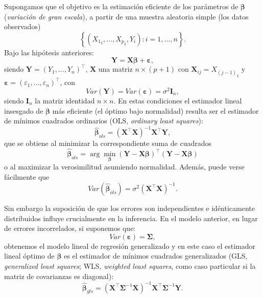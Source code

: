 \documentclass[
]{book}
\theoremstyle{break}
\theoremstyle{definition}
\theoremstyle{definition}
\theoremstyle{definition}
\theoremstyle{definition}
\theoremstyle{remark}
\begin{document}
Supongamos que el objetivo es la estimación eficiente de los parámetros de \(\boldsymbol{\beta}\) (\emph{variación de gran escala}), a partir de una muestra aleatoria simple (los datos observados)
\[\left\{ \left( {X_1}_i, \ldots, {X_p}_i, Y_{i} \right)  : i = 1, \ldots, n \right\}.\]
Bajo las hipótesis anteriores:
\[\mathbf{Y} = \mathbf{X}\boldsymbol{\beta} + \boldsymbol{\varepsilon},\]
siendo \(\mathbf{Y}=\left( Y_1, \ldots, Y_n \right)^{\top}\), \(\mathbf{X}\) una matriz \(n\times (p+1)\) con \(\mathbf{X}_{ij} = {X_{(j-1)}}_i\) y \(\boldsymbol{\varepsilon} = \left( \varepsilon_1, \ldots,\varepsilon_n \right)^{\top}\), con
\[Var\left( \mathbf{Y} \right) =Var\left( \boldsymbol{\varepsilon} \right) = \sigma^{2} \mathbf{I}_{n},\]
siendo \(\mathbf{I}_{n}\) la matriz identidad \(n\times n\).
En estas condiciones el estimador lineal insesgado de \(\boldsymbol{\beta}\) más eficiente (el óptimo bajo normalidad) resulta ser el estimador de mínimos cuadrados ordinarios (OLS, \emph{ordinary least squares}):
\begin{equation} 
  \hat{\boldsymbol{\beta}}_{ols}=(\mathbf{X}^{\top}\mathbf{X})^{-1}\mathbf{X}^{\top}\mathbf{Y},
  \label{eq:beta-ols-rlm}
\end{equation}
que se obtiene al minimizar la correspondiente suma de cuadrados
\[\hat{\boldsymbol{\beta}}_{ols} = \arg \min_{\mathbf{\beta }}\left( \mathbf{Y}-\mathbf{X}\mathbf{\beta }\right)^{\top }\left( \mathbf{Y}-\mathbf{X}\mathbf{\beta }\right)\]
o al maximizar la verosimilitud asumiendo normalidad.
Además, puede verse fácilmente que
\[Var(\hat{\boldsymbol{\beta}}_{ols})=\sigma^{2}(\mathbf{X}^{\top}\mathbf{X})^{-1}.\]

Sin embargo la suposición de que los errores son independientes e idénticamente distribuidos influye crucialmente en la inferencia.
En el modelo anterior, en lugar de errores incorrelados, si suponemos que:
\[Var\left( \boldsymbol{\varepsilon} \right) =\boldsymbol{\Sigma},\]
obtenemos el modelo lineal de regresión generalizado y en este caso el estimador lineal óptimo de \(\boldsymbol{\beta}\) es el estimador de mínimos cuadrados generalizados (GLS, \emph{generalized least squares}; WLS, \emph{weighted least squares}, como caso particular si la matriz de covarianzas es diagonal):
\begin{equation} 
  \hat{\boldsymbol{\beta}}_{gls} =(\mathbf{X}^{\top}\boldsymbol{\Sigma}^{-1} \mathbf{X})^{-1} \mathbf{X}^{\top}\boldsymbol{\Sigma}^{-1} \mathbf{Y}.
  \label{eq:beta-gls-rlm}
\end{equation}
\end{document}
